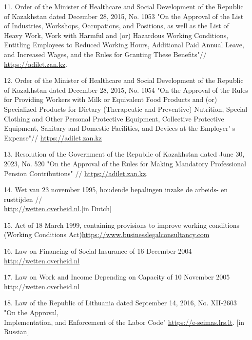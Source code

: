 \begin{references}
11. Order of the Minister of Healthcare and Social Development of the
Republic of Kazakhstan dated December 28, 2015, No. 1053 "On the
Approval of the List of Industries, Workshops, Occupations, and
Positions, as well as the List of Heavy Work, Work with Harmful and (or)
Hazardous Working Conditions, Entitling Employees to Reduced Working
Hours, Additional Paid Annual Leave, and Increased Wages, and the Rules
for Granting These Benefits"//
\href{https://adilet.zan.kz/rus/docs/V1500012731}{https://adilet.zan.kz}.

12. Order of the Minister of Healthcare and Social Development of the
Republic of Kazakhstan dated December 28, 2015, No. 1054 "On the
Approval of the Rules for Providing Workers with Milk or Equivalent Food
Products and (or) Specialized Products for Dietary (Therapeutic and
Preventive) Nutrition, Special Clothing and Other Personal Protective
Equipment, Collective Protective Equipment, Sanitary and Domestic
Facilities, and Devices at the Employer' s Expense"//
\href{https://adilet.zan.kz/rus/docs/V1500012675}{https://adilet.zan.kz}

13. Resolution of the Government of the Republic of Kazakhstan dated
June 30, 2023, No. 520 "On the Approval of the Rules for Making
Mandatory Professional Pension Contributions" //
\href{https://adilet.zan.kz/rus/docs/P2300000520}{https://adilet.zan.kz}.

14. Wet van 23 november 1995, houdende bepalingen inzake de arbeids- en
rusttijden //\\\href{http://wetten.overheid.nl/jci1.3:c:BWBR0007671}{http://wetten.overheid.nl}.{[}in
Dutch{]}

15. Act of 18 March 1999, containing provisions to improve working
conditions (Working Conditions
Act)\href{https://www.businesslegalconsultancy.com/en/act-of-march-18-1999-containing-provisions-to-improve-working-conditions-act-on-working-conditions-1/}{https://www.businesslegalconsultancy.com}

16. Law on Financing of Social Insurance of 16 December 2004
\href{http://wetten.overheid.nl/jci1.3:c:BWBR0017745}{http://wetten.overheid.nl}

17. Law on Work and Income Depending on Capacity of 10 November 2005
\href{http://wetten.overheid.nl/jci1.3:c:BWBR0019057}{http://wetten.overheid.nl}

18. Law of the Republic of Lithuania dated September 14, 2016, No.
XII-2603 "On the Approval, \\Implementation, and Enforcement of the Labor
Code"
\href{https://e-seimas.lrs.lt/portal/legalAct/lt/TAD/bb10e743a97f11eb98ccba226c8a14d7?jfwid=kjtiqjlgg}{https://e-seimas.lrs.lt}.
{[}in Russian{]}


\end{references}
